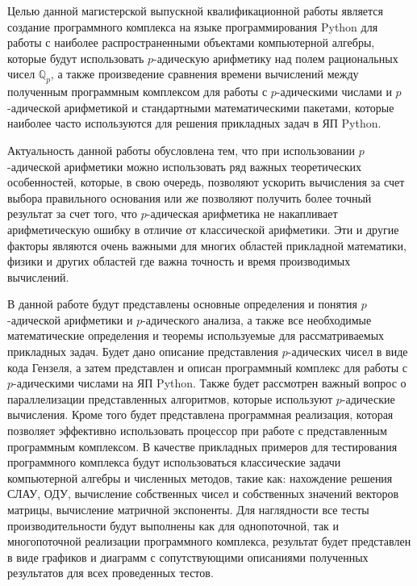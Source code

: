 \documentclass[master, och, diploma, times]{sty/SCWorks}
\theoremstyle{plain}
\theoremstyle{definition}
\numberwithin{equation}{section}
\begin{document}
Целью данной магистерской выпускной квалификационной работы является создание программного комплекса на языке программирования Python для работы с наиболее распространенными объектами компьютерной алгебры, которые будут использовать $p$-адическую арифметику над полем рациональных чисел $\mathbb{Q}_p$, а также произведение сравнения времени вычислений между полученным программным комплексом для работы с $p$-адическими числами и $p$-адической арифметикой и стандартными математическими пакетами, которые наиболее часто используются для решения прикладных задач в ЯП Python.


Актуальность данной работы обусловлена тем, что при использовании $p$-адической арифметики можно использовать ряд важных теоретических особенностей, которые, в свою очередь, позволяют ускорить вычисления за счет выбора правильного основания или же  позволяют получить более точный результат за счет того, что $p$-адическая арифметика не накапливает арифметическую ошибку в отличие от классической арифметики. Эти и другие факторы являются очень важными для многих областей прикладной математики, физики и других областей где важна точность и время производимых вычислений.

В данной работе будут представлены основные определения и понятия $p$-адической арифметики и $p$-адического анализа, а также все необходимые математические определения и теоремы используемые для рассматриваемых прикладных задач. Будет дано описание представления $p$-адических чисел в виде кода Гензеля, а затем представлен и описан программный комплекс для работы с $p$-адическими числами на ЯП Python. Также будет рассмотрен важный вопрос о параллелизации представленных алгоритмов, которые используют $p$-адические вычисления. Кроме того будет представлена программная реализация, которая позволяет эффективно использовать процессор при работе с представленным программным комплексом. В качестве прикладных примеров для тестирования программного комплекса будут использоваться классические задачи компьютерной алгебры и численных методов, такие как: нахождение решения СЛАУ, ОДУ, вычисление собственных чисел и собственных значений векторов матрицы, вычисление матричной экспоненты. Для наглядности все тесты производительности будут выполнены  как для однопоточной, так и многопоточной реализации программного комплекса, результат будет представлен в виде графиков и диаграмм с сопутствующими описаниями полученных результатов для всех проведенных тестов.


\end{document}
